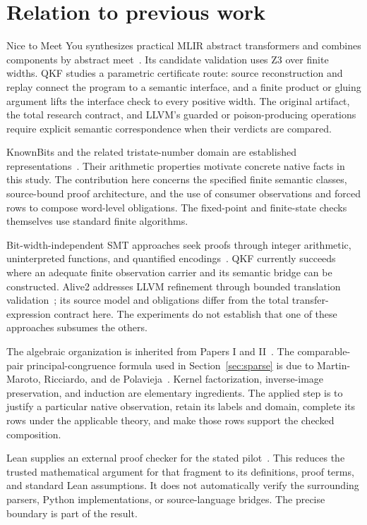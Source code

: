 \section{Relation to previous work}

Nice to Meet You synthesizes practical MLIR abstract transformers and combines components by abstract meet~\cite{Peng2026,NTMYArtifact}. Its candidate validation uses Z3 over finite widths. QKF studies a parametric certificate route: source reconstruction and replay connect the program to a semantic interface, and a finite product or gluing argument lifts the interface check to every positive width. The original artifact, the total research contract, and LLVM's guarded or poison-producing operations require explicit semantic correspondence when their verdicts are compared.

KnownBits and the related tristate-number domain are established representations~\cite{LLVMKnownBits,Vishwanathan2022}. Their arithmetic properties motivate concrete native facts in this study. The contribution here concerns the specified finite semantic classes, source-bound proof architecture, and the use of consumer observations and forced rows to compose word-level obligations. The fixed-point and finite-state checks themselves use standard finite algorithms.

Bit-width-independent SMT approaches seek proofs through integer arithmetic, uninterpreted functions, and quantified encodings~\cite{Niemetz2019}. QKF currently succeeds where an adequate finite observation carrier and its semantic bridge can be constructed. Alive2 addresses LLVM refinement through bounded translation validation~\cite{Lopes2021}; its source model and obligations differ from the total transfer-expression contract here. The experiments do not establish that one of these approaches subsumes the others.

The algebraic organization is inherited from Papers I and II~\cite{ShcherbakovI,ShcherbakovII}. The comparable-pair principal-congruence formula used in Section~\ref{sec:sparse} is due to Martin-Maroto, Ricciardo, and de Polavieja~\cite{MartinMaroto2026}. Kernel factorization, inverse-image preservation, and induction are elementary ingredients. The applied step is to justify a particular native observation, retain its labels and domain, complete its rows under the applicable theory, and make those rows support the checked composition.

Lean supplies an external proof checker for the stated pilot~\cite{Lean4,LeanReference}. This reduces the trusted mathematical argument for that fragment to its definitions, proof terms, and standard Lean assumptions. It does not automatically verify the surrounding parsers, Python implementations, or source-language bridges. The precise boundary is part of the result.
